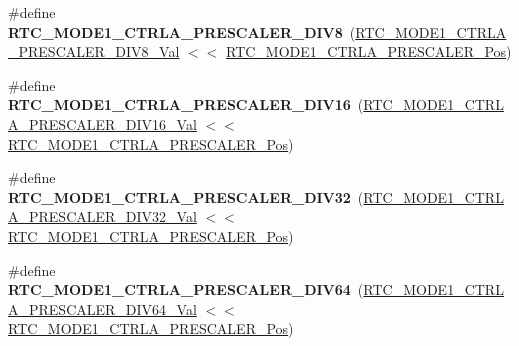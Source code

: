 \begin{DoxyCompactItemize}
\item 
\hypertarget{group___s_a_m_l21___r_t_c_ga390ac00b00280681424403cc9e477af8}{}\#define {\bfseries R\+T\+C\+\_\+\+M\+O\+D\+E1\+\_\+\+C\+T\+R\+L\+A\+\_\+\+P\+R\+E\+S\+C\+A\+L\+E\+R\+\_\+\+D\+I\+V8}~(\hyperlink{group___s_a_m_l21___r_t_c_gadb7983b0157872c129ad570190940b94}{R\+T\+C\+\_\+\+M\+O\+D\+E1\+\_\+\+C\+T\+R\+L\+A\+\_\+\+P\+R\+E\+S\+C\+A\+L\+E\+R\+\_\+\+D\+I\+V8\+\_\+\+Val} $<$$<$ \hyperlink{group___s_a_m_l21___r_t_c_ga90e26e080dcf46aa7e9f09a8ed02ea7e}{R\+T\+C\+\_\+\+M\+O\+D\+E1\+\_\+\+C\+T\+R\+L\+A\+\_\+\+P\+R\+E\+S\+C\+A\+L\+E\+R\+\_\+\+Pos})\label{group___s_a_m_l21___r_t_c_ga390ac00b00280681424403cc9e477af8}

\item 
\hypertarget{group___s_a_m_l21___r_t_c_ga555fb420ca9704601e44cb267ce2d923}{}\#define {\bfseries R\+T\+C\+\_\+\+M\+O\+D\+E1\+\_\+\+C\+T\+R\+L\+A\+\_\+\+P\+R\+E\+S\+C\+A\+L\+E\+R\+\_\+\+D\+I\+V16}~(\hyperlink{group___s_a_m_l21___r_t_c_ga59bb15bf7c24c72a608b95c515938744}{R\+T\+C\+\_\+\+M\+O\+D\+E1\+\_\+\+C\+T\+R\+L\+A\+\_\+\+P\+R\+E\+S\+C\+A\+L\+E\+R\+\_\+\+D\+I\+V16\+\_\+\+Val} $<$$<$ \hyperlink{group___s_a_m_l21___r_t_c_ga90e26e080dcf46aa7e9f09a8ed02ea7e}{R\+T\+C\+\_\+\+M\+O\+D\+E1\+\_\+\+C\+T\+R\+L\+A\+\_\+\+P\+R\+E\+S\+C\+A\+L\+E\+R\+\_\+\+Pos})\label{group___s_a_m_l21___r_t_c_ga555fb420ca9704601e44cb267ce2d923}

\item 
\hypertarget{group___s_a_m_l21___r_t_c_ga9613baed08d7559e4f45c569474fcf96}{}\#define {\bfseries R\+T\+C\+\_\+\+M\+O\+D\+E1\+\_\+\+C\+T\+R\+L\+A\+\_\+\+P\+R\+E\+S\+C\+A\+L\+E\+R\+\_\+\+D\+I\+V32}~(\hyperlink{group___s_a_m_l21___r_t_c_gaa70b57e6d6c684795ed419ad3ca49742}{R\+T\+C\+\_\+\+M\+O\+D\+E1\+\_\+\+C\+T\+R\+L\+A\+\_\+\+P\+R\+E\+S\+C\+A\+L\+E\+R\+\_\+\+D\+I\+V32\+\_\+\+Val} $<$$<$ \hyperlink{group___s_a_m_l21___r_t_c_ga90e26e080dcf46aa7e9f09a8ed02ea7e}{R\+T\+C\+\_\+\+M\+O\+D\+E1\+\_\+\+C\+T\+R\+L\+A\+\_\+\+P\+R\+E\+S\+C\+A\+L\+E\+R\+\_\+\+Pos})\label{group___s_a_m_l21___r_t_c_ga9613baed08d7559e4f45c569474fcf96}

\item 
\hypertarget{group___s_a_m_l21___r_t_c_ga878ae984c2555f5bd29d16e486aa0555}{}\#define {\bfseries R\+T\+C\+\_\+\+M\+O\+D\+E1\+\_\+\+C\+T\+R\+L\+A\+\_\+\+P\+R\+E\+S\+C\+A\+L\+E\+R\+\_\+\+D\+I\+V64}~(\hyperlink{group___s_a_m_l21___r_t_c_ga6b5465a569345c2a385df1c924db0db4}{R\+T\+C\+\_\+\+M\+O\+D\+E1\+\_\+\+C\+T\+R\+L\+A\+\_\+\+P\+R\+E\+S\+C\+A\+L\+E\+R\+\_\+\+D\+I\+V64\+\_\+\+Val} $<$$<$ \hyperlink{group___s_a_m_l21___r_t_c_ga90e26e080dcf46aa7e9f09a8ed02ea7e}{R\+T\+C\+\_\+\+M\+O\+D\+E1\+\_\+\+C\+T\+R\+L\+A\+\_\+\+P\+R\+E\+S\+C\+A\+L\+E\+R\+\_\+\+Pos})\label{group___s_a_m_l21___r_t_c_ga878ae984c2555f5bd29d16e486aa0555}


\end{DoxyCompactItemize}
